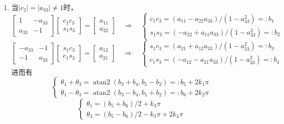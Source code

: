 \begin{enumerate}
\item[(III)] 当$|c_2| = |a_{33}| \neq 1$时，
\begin{equation}
\begin{bmatrix}
1   & -a_{33} \\ a_{33} & -1
\end{bmatrix}
\begin{bmatrix}
c_1c_3 \\ s_1s_3
\end{bmatrix}
=
\begin{bmatrix}
a_{11} \\ a_{22}
\end{bmatrix}
\quad\Rightarrow\quad
\begin{cases}
c_1c_3 = (a_{11} - a_{22}a_{33})/(1 - a_{33}^2) =: b_1 \\[3pt]
s_1s_3 = (-a_{22} + a_{11}a_{33})/(1 - a_{33}^2) =: b_2
\end{cases}
\end{equation}
\begin{equation}
\begin{bmatrix}
-a_{33} & -1 \\ -1 & a_{33}
\end{bmatrix}
\begin{bmatrix}
s_1c_3 \\ c_1s_3
\end{bmatrix}
=
\begin{bmatrix}
a_{12} \\ a_{21}
\end{bmatrix}
\quad\Rightarrow\quad
\begin{cases}
s_1c_3 = (a_{21} + a_{12}a_{33})/(1 - a_{33}^2) =: b_3 \\[3pt]
c_1s_3 = (-a_{12} - a_{21}a_{33})/(1 - a_{33}^2) =: b_4
\end{cases}
\end{equation}
进而有
\begin{equation}
\begin{cases}
\theta_1 + \theta_3 = \operatorname{atan2}(b_3 + b_4, b_1 - b_2) =: b_5 + 2k_1\pi \\[4pt]
\theta_1 - \theta_3 = \operatorname{atan2}(b_3 - b_4, b_1 + b_2) =: b_6 + 2k_2\pi
\end{cases}
\end{equation}
\begin{equation}
\begin{cases}
\theta_1 = (b_5 + b_6)/2 + k_3\pi \\[4pt]
\theta_3 = (b_5 - b_6)/2 - k_3\pi + 2k_4\pi
\end{cases}
\end{equation}
\end{enumerate}

